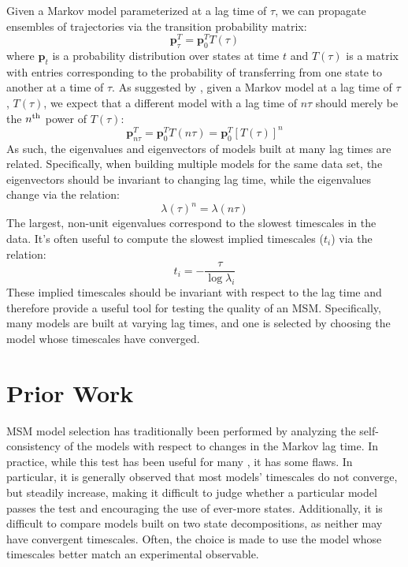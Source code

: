 \documentclass[journal=jpcbfk, layout=traditional, manuscript=article]{achemso}
\begin{document}
Given a Markov model parameterized at a lag time of $\tau$, we can propagate ensembles of trajectories via the transition probability matrix:
$$\mathbf{p}_\tau^T = \mathbf{p}_0^T T(\tau)$$ where $\mathbf{p}_t$ is a probability distribution over states at time $t$ and $T(\tau)$ is a matrix with entries corresponding to the probability of transferring from one state to another at a time of $\tau$. As suggested by \citet{Swope2004Describing}, given a Markov model at a lag time of $\tau$, $T(\tau)$, we expect that a different model with a lag time of $n\tau$ should merely be the $n^\textnormal{th}$ power of $T(\tau)$:
$$\mathbf{p}_{n\tau}^T = \mathbf{p}_0^T T(n\tau) = \mathbf{p}_0^T \left[T(\tau)\right]^n $$ As such, the eigenvalues and eigenvectors of models built at many lag times are related. Specifically, when building multiple models for the same data set, the eigenvectors should be invariant to changing lag time, while the eigenvalues change via the relation:
$$\lambda(\tau)^n = \lambda(n \tau)$$ The largest, non-unit eigenvalues correspond to the slowest timescales in the data. It's often useful to compute the slowest implied timescales ($t_i$) via the relation:
$$t_i = - \frac{\tau}{\log \lambda_i} $$ These implied timescales should be invariant with respect to the lag time and therefore provide a useful tool for testing the quality of an MSM. Specifically, many models are built at varying lag times, and one is selected by choosing the model whose timescales have converged.

\section{Prior Work}
MSM model selection has traditionally been performed by analyzing the self-consistency of the models with respect to changes in the Markov lag time. In practice, while this test has been useful for many \cite{Noe2009Constructing}, it has some flaws. In particular, it is generally observed that most models' timescales do not converge, but steadily increase, making it difficult to judge whether a particular model passes the test and encouraging the use of ever-more states. Additionally, it is difficult to compare models built on two state decompositions, as neither may have convergent timescales. Often, the choice is made to use the model whose timescales better match an experimental observable.
\end{document}
